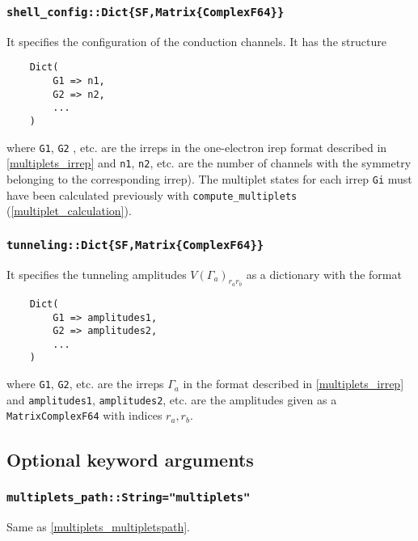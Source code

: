 \documentclass[notitlepage]{article}
\begin{document}
\subsubsection{\texttt{shell\_config::Dict\{SF,Matrix\{ComplexF64\}\}}}
\label{nrg_shellconfig}
It specifies the configuration of the conduction channels.
It has the structure
\begin{verbatim}
    Dict( 
        G1 => n1,
        G2 => n2,
        ...
    )
\end{verbatim}
where \texttt{G1}, \texttt{G2} , etc. are the irreps in the
one-electron irep format described in \ref{multiplets_irrep}
and \texttt{n1}, \texttt{n2}, etc. are the number of
channels with the symmetry belonging to the corresponding
irrep). The multiplet states for each irrep \texttt{Gi} must
have been calculated previously with
\texttt{compute\_multiplets} (\ref{multiplet_calculation}).

\subsubsection{\texttt{tunneling::Dict\{SF,Matrix\{ComplexF64\}\}}}
\label{nrg_tunnneling}
It specifies the tunneling amplitudes $V(\Gamma_a)_{r_a
r_b}$ as a dictionary with the format
\begin{verbatim}
    Dict(
        G1 => amplitudes1,
        G2 => amplitudes2,
        ...
    )
\end{verbatim}
where \texttt{G1}, \texttt{G2}, etc. are the irreps
$\Gamma_a$ in the format described in \ref{multiplets_irrep}
and \texttt{amplitudes1}, \texttt{amplitudes2}, etc. are the
amplitudes given as a \texttt{Matrix{ComplexF64}} with
indices $r_a,r_b$.

\subsection{Optional keyword arguments}

\subsubsection{\texttt{multiplets\_path::String="multiplets"}}
\label{nrg_multipletspath}
Same as \ref{multiplets_multipletspath}.
\end{document}
